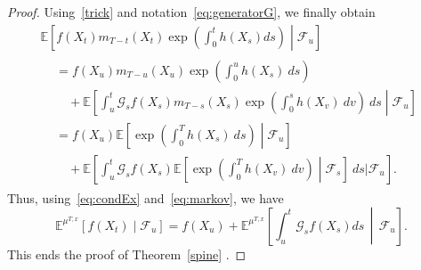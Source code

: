 \documentclass[10pt]{amsart}
\theoremstyle{definition}\newtheorem{defi}[theo]{Definition}\newtheorem{rema}[theo]{Remark}\newtheorem{exam}[theo]{Example}\newtheorem{exem}[theo]{Example}\newtheorem{nota}[theo]{Notation}
\newcommand{\Fo}{\mathcal{F}}
\newcommand{\Go}{\mathcal{G}}
\newcommand*\E{\mathbb{E}}
\begin{document}
\begin{proof}
Using~\eqref{trick} and notation~\eqref{eq:generatorG}, we finally obtain
\begin{multline*}
\E\left[f\left(X_{t}\right)m_{T-t}\left(X_{t}\right)\exp\left(\int_{0}^{t}h\left(X_{s}\right)ds \right)\middle| \Fo_{u}\right]\\
\begin{aligned}
&=f\left(X_{u}\right)m_{T-u}\left(X_{u}\right)\exp\left(\int_{0}^{u}h\left(X_{s}\right)\ ds \right)\\
&\quad+\E\left[\int_{u}^{t}\Go_{s}f\left(X_{s}\right)m_{T-s}\left(X_{s}\right) \exp\left(\int_{0}^{s}h\left(X_{v}\right)\ dv \right)\ ds\middle| \Fo_{u}\right]\\
&= f\left(X_{u}\right)\E\left[\exp\left(\int_{0}^{T}h\left(X_{s}\right)\ ds \right)\middle| \Fo_{u} \right] \\
&\quad+\E\left[\int_{u}^{t}\Go_{s}f\left(X_{s}\right) \E\left[\exp\left(\int_{0}^{T}h\left(X_{v}\right)\ dv \right)\middle| \Fo_{s}\right]\ ds\Bigg| \Fo_{u}\right].
\end{aligned}
\end{multline*}
Thus, using~\eqref{eq:condEx} and~\eqref{eq:markov}, we have
\[
\E^{\mu^{T, x}}\left[f\left(X_{t}\right)\middle| \Fo_{u}\right] =f\left(X_{u}\right)+\E^{\mu^{T, x}}\left[\int_{u}^{t}\Go_{s}f(X_{s})ds \,\middle|\, \Fo_{u}\right].
\]
This ends the proof of Theorem~\ref{spine} .
\end{proof}
\end{document}
